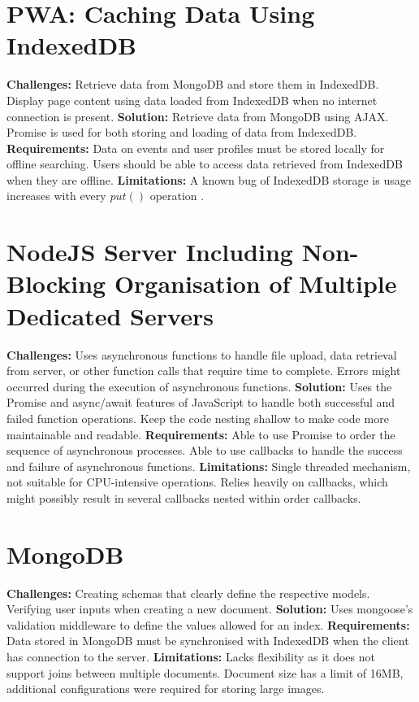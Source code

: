 \documentclass[11pt, a4paper]{article}
\begin{document}
\section{PWA: Caching Data Using IndexedDB}
\textbf{Challenges:} Retrieve data from MongoDB and store them in IndexedDB. Display page content
using data loaded from IndexedDB when no internet connection is present. \textbf{Solution:} Retrieve
data from MongoDB using AJAX. Promise is used for both storing and loading of data from IndexedDB.
\textbf{Requirements:} Data on events and user profiles must be stored locally for offline searching.
Users should be able to access data retrieved from IndexedDB when they are offline.
\textbf{Limitations:} A known bug of IndexedDB storage is usage increases with every $put()$
operation \cite{leveldb_593, leveldb_603}.

\section{NodeJS Server Including Non-Blocking Organisation of Multiple Dedicated Servers}
\textbf{Challenges:} Uses asynchronous functions to handle file upload, data retrieval from server,
or other function calls that require time to complete. Errors might occurred during the execution
of asynchronous functions. \textbf{Solution:} Uses the Promise and async/await features of
JavaScript to handle both successful and failed function operations. Keep the code nesting shallow
to make code more maintainable and readable. \textbf{Requirements:} Able to use Promise to order the
sequence of asynchronous processes. Able to use callbacks to handle the success and failure of
asynchronous functions. \textbf{Limitations:} Single threaded mechanism, not suitable for
CPU-intensive operations. Relies heavily on callbacks, which might possibly result in several
callbacks nested within order callbacks.

\section{MongoDB}
\textbf{Challenges:} Creating schemas that clearly define the respective models. Verifying user
inputs when creating a new document. \textbf{Solution:} Uses mongoose's validation middleware
\cite{validation} to define the values allowed for an index. \textbf{Requirements:} Data stored in
MongoDB must be synchronised with IndexedDB when the client has connection to the server.
\textbf{Limitations:} Lacks flexibility as it does not support joins between multiple documents.
Document size has a limit of 16MB, additional configurations were required for storing large images.
\end{document}
